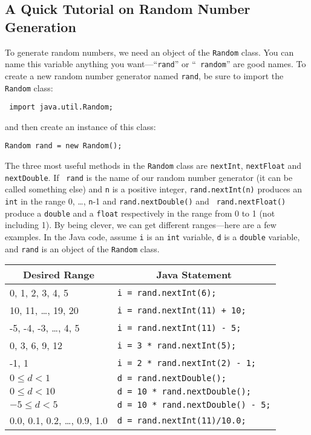 \vspace{-0.05in}
\subsection*{A Quick Tutorial on Random Number Generation}
\vspace{-0.05in}
To generate random numbers, we need an object of the {\tt Random} class.
You can name this variable anything you want---``{\tt rand}'' or ``{\tt
random}'' are good names. To create a new random number generator
named {\tt rand}, be sure to import the {\tt Random} class:

\vspace{-0.1in}
\begin{center}
\verb$ import java.util.Random;$
\end{center}
\vspace{-0.1in}

and then create an instance of this class:

\vspace{-0.1in}
\begin{center}
\verb$Random rand = new Random();$
\end{center}
\vspace{-0.1in}

The three most useful methods in the {\tt Random} class are {\tt nextInt}, {\tt nextFloat} and {\tt nextDouble}. If {\tt
rand} is the name of our random number generator (it can be called something else) and {\tt n} is a positive integer,
{\tt rand.nextInt(n)} produces an {\tt int} in the range 0, \ldots, {\tt n}-1 and {\tt rand.nextDouble()} and {\tt
rand.nextFloat()} produce a {\tt double} and a {\tt float} respectively in the range from 0 to 1 (not including 1).
By being clever, we can get different ranges---here are a few examples. In the Java code, assume {\tt i} is an {\tt int}
variable, {\tt d} is a {\tt double} variable, and {\tt rand} is an object of the {\tt Random} class.

\begin{center}
\begin{tabular}{p{2.5in}p{3.5in}}
\multicolumn{1}{c}{\bf Desired Range} & \multicolumn{1}{c}{\bf Java
Statement}\\\hline
0, 1, 2, 3, 4, 5 & \verb$i = rand.nextInt(6);$\\
10, 11, \ldots, 19, 20 & \verb$i = rand.nextInt(11) + 10;$\\
-5, -4, -3, \ldots, 4, 5 & \verb$i = rand.nextInt(11) - 5;$\\
0, 3, 6, 9, 12 & \verb$i = 3 * rand.nextInt(5);$\\
-1, 1 & \verb$i = 2 * rand.nextInt(2) - 1;$\\
$0 \leq d < 1$ & \verb$d = rand.nextDouble();$\\
$0 \leq d < 10$ & \verb$d = 10 * rand.nextDouble();$\\
$-5 \leq d < 5$ & \verb$d = 10 * rand.nextDouble() - 5;$\\
0.0, 0.1, 0.2, \ldots, 0.9, 1.0 & \verb$d = rand.nextInt(11)/10.0;$
\end{tabular}
\end{center}

